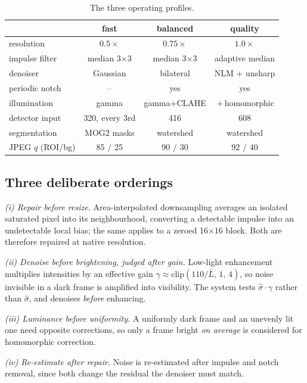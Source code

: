 \documentclass[conference,10pt]{IEEEtran}
\newcommand{\hdr}[1]{\textbf{#1}}
\begin{document}
\begin{table}[!t]
\caption{The three operating profiles.}
\label{tab:profiles}
\centering
\scriptsize
\begin{tabular}{@{}lccc@{}}
\toprule
 & \hdr{fast} & \hdr{balanced} & \hdr{quality} \\
\midrule
resolution        & $0.5\times$   & $0.75\times$  & $1.0\times$ \\
impulse filter    & median 3$\times$3 & median 3$\times$3 & adaptive median \\
denoiser          & Gaussian      & bilateral     & NLM + unsharp \\
periodic notch    & --            & yes           & yes \\
illumination      & gamma         & gamma+CLAHE   & \,+\,homomorphic \\
detector input    & 320, every 3rd & 416          & 608 \\
segmentation      & MOG2 masks    & watershed     & watershed \\
JPEG $q$ (ROI/bg) & 85 / 25       & 90 / 30       & 92 / 40 \\
\bottomrule
\end{tabular}
\end{table}

\subsection{Three deliberate orderings}\label{sec:design-order}
\textit{(i) Repair before resize.} Area-interpolated downsampling averages an
isolated saturated pixel into its neighbourhood, converting a detectable
impulse into an undetectable local bias; the same applies to a zeroed
16$\times$16 block. Both are therefore repaired at native resolution.

\textit{(ii) Denoise before brightening, judged after gain.} Low-light
enhancement multiplies intensities by an effective gain
$\gamma \approx \mathrm{clip}(110/\bar{L},\,1,\,4)$, so noise invisible in a
dark frame is amplified into visibility. The system tests
$\hat\sigma\cdot\gamma$ rather than $\hat\sigma$, and denoises \emph{before}
enhancing.

\textit{(iii) Luminance before uniformity.} A uniformly dark frame and an
unevenly lit one need opposite corrections, so only a frame bright \emph{on
average} is considered for homomorphic correction.

\textit{(iv) Re-estimate after repair.} Noise is re-estimated after impulse and
notch removal, since both change the residual the denoiser must match.
\end{document}
